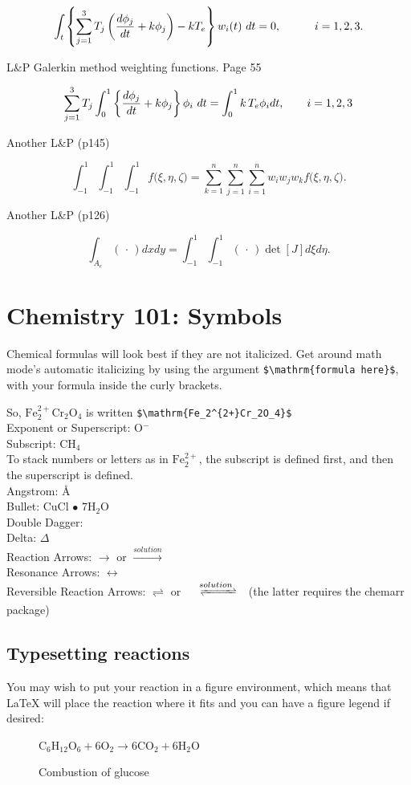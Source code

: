 \documentclass[12pt,twoside]{reedthesis}
\begin{document}
$$
\int_t\left\{\sum_{j=1}^3 T_j \left({d\phi_j\over dt}+k\phi_j\right)-kT_e\right\}w_i(t)\ dt=0,
   \qquad\quad i=1,2,3. 
$$

L\&P  Galerkin method weighting functions.  Page 55

$$
\sum_{j=1}^3 T_j\int_0^1\left\{{d\phi_j\over dt} + k\phi_j\right\} \phi_i\ dt 
   = \int_{0}^1k\,T_e\phi_idt, \qquad i=1,2,3 $$
   
Another L\&P (p145)

$$
\int_{-1}^1\!\int_{-1}^1\!\int_{-1}^1 f\big(\xi,\eta,\zeta\big) 
   = \sum_{k=1}^n\sum_{j=1}^n\sum_{i=1}^n w_i w_j w_k f\big( \xi,\eta,\zeta\big).
$$

Another L\&P (p126)

$$
\int_{A_e} (\,\cdot\,) dx dy = \int_{-1}^1\!\int_{-1}^1 (\,\cdot\,) \det[J] d\xi d\eta.
$$

\section{Chemistry 101: Symbols}
Chemical formulas will look best if they are not italicized. Get around math mode's automatic italicizing by using the argument \verb=$\mathrm{formula here}$=, with your formula inside the curly brackets.

So, $\mathrm{Fe_2^{2+}Cr_2O_4}$ is written \verb=$\mathrm{Fe_2^{2+}Cr_2O_4}$=\\
Exponent or Superscript: O$^{-}$\\
Subscript: CH$_{4}$\\

To stack numbers or letters as in $\mathrm{Fe_2^{2+}}$, the subscript is defined first, and then the superscript is defined.\\
Angstrom: {\AA}\\
Bullet: CuCl $\bullet$ 7H${_2}$O\\
Double Dagger: \ddag \/\\
Delta: $\Delta$\\
Reaction Arrows: $\longrightarrow$ or  $\xrightarrow{solution}$\\
Resonance Arrows: $\leftrightarrow$\\
Reversible Reaction Arrows: $\rightleftharpoons$ or $\xrightleftharpoons[ ]{solution}$ (the latter requires the chemarr package)\\


\subsection{Typesetting reactions}
You may wish to put your reaction in a figure environment, which means that LaTeX will place the reaction where it fits and you can have a figure legend if desired:
\begin{figure}[htbp]
\begin{center}
$\mathrm{C_6H_{12}O_6  + 6O_2} \longrightarrow \mathrm{6CO_2 + 6H_2O}$
\caption{Combustion of glucose}
\label{combustion of glucose}
\end{center}
\end{figure}
\end{document}
